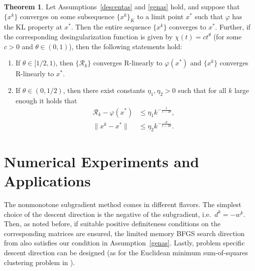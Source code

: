 \documentclass[a4paper, 12pt]{article}
\numberwithin{equation}{section}
\theoremstyle{bolddef}
\theoremstyle{definition}
\theoremstyle{boldplain}
\newtheorem{theorem}[definition]{Theorem}
\newcommand{\xk}{x^k}
\newcommand{\wk}{w^k}
\newcommand{\dk}{d^k}
\newcommand{\Rvalue}{\mathcal{R}}
\begin{document}
\begin{theorem}\label{thm:convergencerate}
Let Assumptions~\ref{descentas} and \ref{genas} hold, and suppose that $\{ \xk \}$ converges on some subsequence $\{ \xk\}_K$ to a limit point $x^*$ such that $\varphi$ has the KL property at $x^*$. Then the entire sequence $\{ \xk \}$ converges to $x^*$. Further, if the corresponding desingularization function is given by $\chi(t) = ct^{\theta}$ (for some $c>0$ and $\theta \in (0,1)$), then the following statements hold:
\begin{enumerate}[label=(\alph*)]
	\item If $\theta \in [1/2, 1)$, then $\{\Rvalue_k\}$ converges R-linearly to $\varphi(x^*)$ and $\{\xk\}$ converges R-linearly to $x^*$. \label{itm1}
	\item If $\theta \in (0, 1/2)$, then there exist constants $\eta_1, \eta_2 > 0$ such that for all $k$ large enough it holds that\label{itm2}
	\begin{align}
		\Rvalue_k - \varphi(x^*) &\leq \eta_1 k^{-\frac{1}{1-2\theta}},\\
		\|\xk - x^*\| &\leq \eta_2 k^{-\frac{\theta}{1-2\theta}}.
	\end{align}
\end{enumerate}
\end{theorem}

\section{Numerical Experiments and Applications}\label{Sec:Numerics}

The nonmonotone subgradient method comes in different flavors. The simplest choice of the descent direction is the negative of the subgradient, i.e.\ $\dk = -\wk$. Then, as noted before, if suitable positive definiteness conditions on the corresponding matrices are ensured, the limited memory BFGS search direction from \cite{liu1989} also satisfies our condition in Assumption~\ref{genas}. Lastly, problem specific descent direction can be designed (as for the Euclidean minimum sum-of-squares clustering problem in \cite{aragon2025}).
\end{document}
